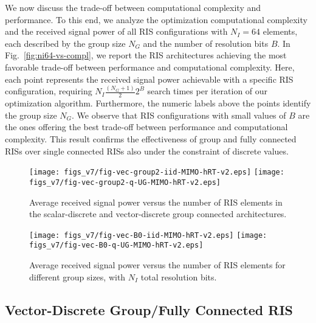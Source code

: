 \documentclass[twocolumn,10pt]{IEEEtran}
\begin{document}
We now discuss the trade-off between computational complexity and performance.
To this end, we analyze the optimization computational complexity and the received signal power of all RIS configurations with $N_I=64$ elements, each described by the group size $N_G$ and the number of resolution bits $B$.
In Fig.~\ref{fig:ni64-vs-compl}, we report the RIS architectures achieving the most favorable trade-off between performance and computational complexity. 
Here, each point represents the received signal power achievable with a specific RIS configuration, requiring $N_{I}\frac{\left(N_{G}+1\right)}{2}2^{B}$ search times per iteration of our optimization algorithm.
Furthermore, the numeric labels above the points identify the group size $N_G$.
We observe that RIS configurations with small values of $B$ are the ones offering the best trade-off between performance and computational complexity.
This result confirms the effectiveness of group and fully connected RISs over single connected RISs also under the constraint of discrete values.

\begin{figure*}[t]
    \centering
    \texttt{[image: figs\_v7/fig-vec-group2-iid-MIMO-hRT-v2.eps]}
    \texttt{[image: figs\_v7/fig-vec-group2-q-UG-MIMO-hRT-v2.eps]}
    \caption{Average received signal power versus the number of RIS elements in the scalar-discrete and vector-discrete group connected architectures.}
    \label{fig:vector-discrete-ng2}
\end{figure*}
\begin{figure*}[t]
    \centering
    \texttt{[image: figs\_v7/fig-vec-B0-iid-MIMO-hRT-v2.eps]}
    \texttt{[image: figs\_v7/fig-vec-B0-q-UG-MIMO-hRT-v2.eps]}
    \caption{Average received signal power versus the number of RIS elements for different group sizes, with $N_{I}$ total resolution bits.}
    \label{fig:vector-discrete-B0}
\end{figure*}

\subsection{Vector-Discrete Group/Fully Connected RIS}
\end{document}
